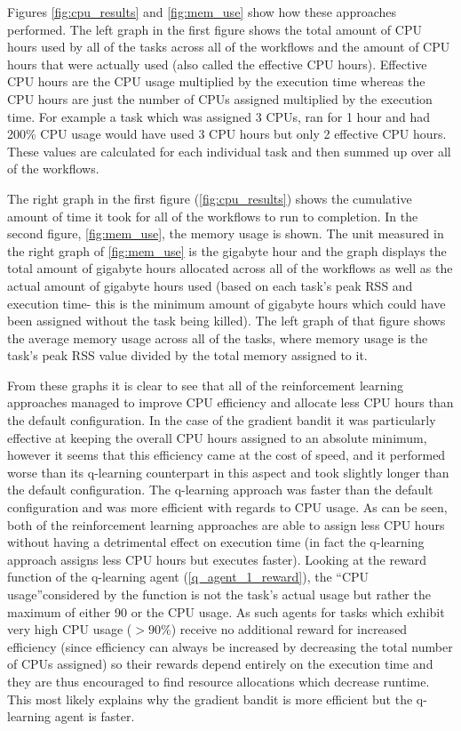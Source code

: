 Figures \ref{fig:cpu_results} and \ref{fig:mem_use} show how these approaches performed. The left graph in the first figure shows the total amount of CPU hours used by all of the tasks across all of the workflows and the amount of CPU hours that were actually used (also called the effective CPU hours). Effective CPU hours are the CPU usage multiplied by the execution time whereas the CPU hours are just the number of CPUs assigned multiplied by the execution time. For example a task which was assigned 3 CPUs, ran for 1 hour and had 200\% CPU usage would have used 3 CPU hours but only 2 effective CPU hours. These values are calculated for each individual task and then summed up over all of the workflows.

The right graph in the first figure (\ref{fig:cpu_results}) shows the cumulative amount of time it took for all of the workflows to run to completion. In the second figure, \ref{fig:mem_use}, the memory usage is shown. The unit measured in the right graph of \ref{fig:mem_use} is the gigabyte hour and the graph displays the total amount of gigabyte hours allocated across all of the workflows as well as the actual amount of gigabyte hours used (based on each task’s peak RSS and execution time- this is the minimum amount of gigabyte hours which could have been assigned without the task being killed). The left graph of that figure shows the average memory usage across all of the tasks, where memory usage is the task’s peak RSS value divided by the total memory assigned to it. 

From these graphs it is clear to see that all of the reinforcement learning approaches managed to improve CPU efficiency and allocate less CPU hours than the default configuration. In the case of the gradient bandit it was particularly effective at keeping the overall CPU hours assigned to an absolute minimum, however it seems that this efficiency came at the cost of speed, and it performed worse than its q-learning counterpart in this aspect and took slightly longer than the default configuration. The q-learning approach was faster than the default configuration and was more efficient with regards to CPU usage. As can be seen, both of the reinforcement learning approaches are able to assign less CPU hours without having a detrimental effect on execution time (in fact the q-learning approach assigns less CPU hours but executes faster). Looking at the reward function of the q-learning agent (\ref{q_agent_1_reward}), the “CPU usage”considered by the function is not the task’s actual usage but rather the maximum of either 90 or the CPU usage. As such agents for tasks which exhibit very high CPU usage ($>90\%$) receive no additional reward for increased efficiency (since efficiency can always be increased by decreasing the total number of CPUs assigned) so their rewards depend entirely on the execution time and they are thus encouraged to find resource allocations which decrease runtime. This most likely explains why the gradient bandit is more efficient but the q-learning agent is faster.

